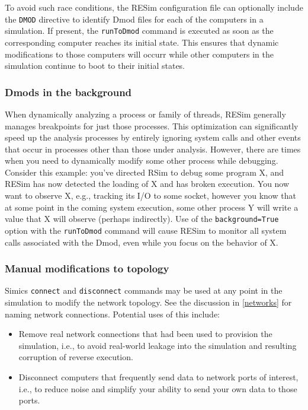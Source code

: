 \documentclass[titlepage]{article}
\begin{document}
To avoid such race conditions, the RESim configuration file can optionally include the {\tt DMOD} directive
to identify Dmod files for each of the computers in a simulation.  If present, the {\tt runToDmod} command is executed
as soon as the corresponding computer reaches its initial state.  This ensures that dynamic modifications
to those computers will occurr while other computers in the simulation continue to boot to their 
initial states.

\subsubsection{Dmods in the background}
\label{background_dmod}
When dynamically analyzing a process or family of threads, RESim generally manages breakpoints for just those processes.
This optimization can significantly speed up the analysis processes by entirely ignoring system calls and other events
that occur in processes other than those under analysis.  However, there are times when you need to dynamically modify some other
process while debugging.  Consider this example: you've directed RSim to debug some program X, and RESim has now detected
the loading of X and has broken execution.  You now want to observe X, e.g., tracking its I/O to some socket, however you
know that at some point in the coming system execution, some other process Y will write a value that X will observe (perhaps
indirectly).  Use of the {\tt background=True} option with the {\tt runToDmod} command will cause RESim to monitor all
system calls associated with the Dmod, even while you focus on the behavior of X. 

\subsubsection{Manual modifications to topology}
\label{manual_net_mods}
Simics {\tt connect} and {\tt disconnect} commands may be used at any point in the simulation to modify the
network topology.  See the discussion in \ref{networks} for naming network connections.  Potential uses of this include:
\begin{itemize}
\item Remove real network connections that had been used to provision the simulation, i.e., to avoid real-world leakage
into the simulation and resulting corruption of reverse execution.
\item Disconnect computers that frequently send data to network ports of interest, i.e., to reduce noise and simplify your
ability to send your own data to those ports.
\end{itemize}
\end{document}
